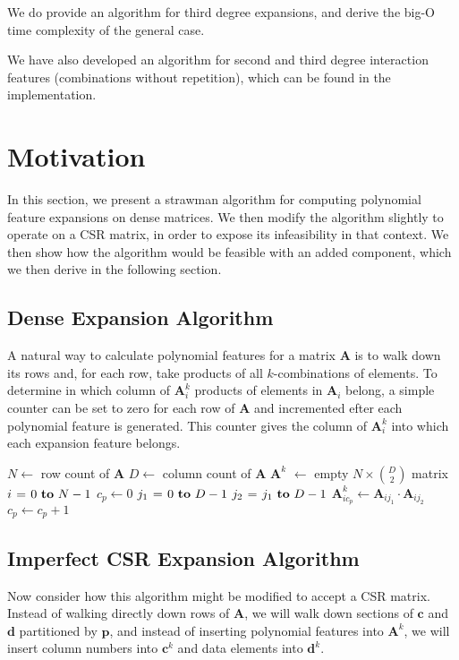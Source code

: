 \documentclass{article}
\begin{document}
We do provide an algorithm for third degree expansions, and derive the big-O time complexity of the general case.

We have also developed an algorithm for second and third degree interaction features (combinations without repetition), which can be found in the implementation.

\section{Motivation}
In this section, we present a strawman algorithm for computing polynomial feature expansions on dense matrices.
We then modify the algorithm  slightly to operate on a CSR matrix, in order to expose its infeasibility in that context.
We then show how the algorithm would be feasible with an added component, which we then derive in the following section.

\subsection{Dense Expansion Algorithm}
A natural way to calculate polynomial features for a matrix $\bm{A}$ is to walk down its rows and, for each row, take products of all $k$-combinations of elements.
To determine in which column of $\bm{A}^k_i$ products of elements in $\bm{A}_i$ belong, a simple counter can be set to zero for each row of $\bm{A}$ and incremented efter each polynomial feature is generated.
This counter gives the column of $\bm{A}^k_i$ into which each expansion feature belongs.

\begin{codebox}
\footnotesize
{}
    \li $N \gets$ row count of $\bm{A}$
    \li $D \gets$ column count of $\bm{A}$
    \li $\bm{A}^k$ $\gets$ empty $N \times \binom{D}{2}$ matrix
    \li \For $i \gets 0 \To N-1$ \Do
    \li     $c_p \gets 0$
    \li     \For $j_1 \gets 0 \To D-1$ \Do
    \li         \For $j_2 \gets j_1 \To D-1$ \Do
    \li             $\bm{A}^k_{i{c_p}} \gets \bm{A}_{ij_1} \cdot \bm{A}_{ij_2}$
    \li             $c_p \gets c_p + 1$
                \End
            \End
       	\End
\end{codebox}

\subsection{Imperfect CSR Expansion Algorithm}
\label{sec:final-algo}
Now consider how this algorithm might be modified to accept a CSR matrix.
Instead of walking directly down rows of $\bm{A}$, we will walk down sections of $\bm{c}$ and $\bm{d}$ partitioned by $\bm{p}$, and instead of inserting polynomial features into $\bm{A}^k$, we will insert column numbers into $\bm{c}^k$ and data elements into $\bm{d}^k$.
\end{document}
